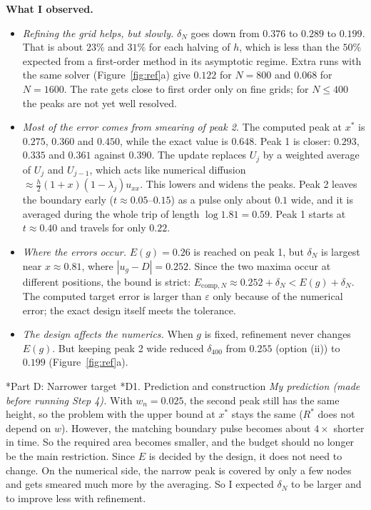 \documentclass[10pt,a4paper]{article}
\makeatletter
\renewcommand\section{\@startsection{section}{1}{0pt}{6pt}{2pt}{\large\bfseries}}
\renewcommand\subsection{\@startsection{subsection}{2}{0pt}{4pt}{1pt}{\normalsize\bfseries}}
\makeatother
\begin{document}
\textbf{What I observed.}
\begin{itemize}
\item \emph{Refining the grid helps, but slowly.} $\delta_N$ goes down from $0.376$ to $0.289$ to $0.199$. That is about $23\%$ and $31\%$ for each halving of $h$, which is less than the $50\%$ expected from a first-order method in its asymptotic regime. Extra runs with the same solver (Figure~\ref{fig:ref}a) give $0.122$ for $N=800$ and $0.068$ for $N=1600$. The rate gets close to first order only on fine grids; for $N\le400$ the peaks are not yet well resolved.
\item \emph{Most of the error comes from smearing of peak 2.} The computed peak at $x^*$ is $0.275$, $0.360$ and $0.450$, while the exact value is $0.648$. Peak 1 is closer: $0.293$, $0.335$ and $0.361$ against $0.390$. The update replaces $U_j$ by a weighted average of $U_j$ and $U_{j-1}$, which acts like numerical diffusion $\approx\frac h2(1+x)(1-\lambda_j)u_{xx}$. This lowers and widens the peaks. Peak 2 leaves the boundary early ($t\approx0.05$--$0.15$) as a pulse only about $0.1$ wide, and it is averaged during the whole trip of length $\log1.81=0.59$. Peak 1 starts at $t\approx0.40$ and travels for only $0.22$.
\item \emph{Where the errors occur.} $E(g)=0.26$ is reached on peak 1, but $\delta_N$ is largest near $x\approx0.81$, where $|u_g-D|=0.252$. Since the two maxima occur at different positions, the bound is strict: $E_{\mathrm{comp},N}\approx0.252+\delta_N<E(g)+\delta_N$. The computed target error is larger than $\varepsilon$ only because of the numerical error; the exact design itself meets the tolerance.
\item \emph{The design affects the numerics.} When $g$ is fixed, refinement never changes $E(g)$. But keeping peak 2 wide reduced $\delta_{400}$ from $0.255$ (option (ii)) to $0.199$ (Figure~\ref{fig:ref}a).
\end{itemize}

\section*{Part D: Narrower target}
\subsection*{D1. Prediction and construction}
\emph{My prediction (made before running Step 4).} With $w_n=0.025$, the second peak still has the same height, so the problem with the upper bound at $x^*$ stays the same ($R^*$ does not depend on $w$). However, the matching boundary pulse becomes about $4\times$ shorter in time. So the required area becomes smaller, and the budget should no longer be the main restriction. Since $E$ is decided by the design, it does not need to change. On the numerical side, the narrow peak is covered by only a few nodes and gets smeared much more by the averaging. So I expected $\delta_N$ to be larger and to improve less with refinement.
\end{document}
